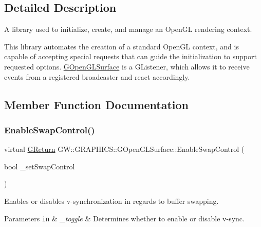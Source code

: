 \subsection{Detailed Description}
A library used to initialize, create, and manage an Open\+GL rendering context. 

This library automates the creation of a standard Open\+GL context, and is capable of accepting special requests that can guide the initialization to support requested options. \mbox{\hyperlink{class_g_w_1_1_g_r_a_p_h_i_c_s_1_1_g_open_g_l_surface}{G\+Open\+G\+L\+Surface}} is a G\+Listener, which allows it to receive events from a registered broadcaster and react accordingly. 

\subsection{Member Function Documentation}
\mbox{\label{class_g_w_1_1_g_r_a_p_h_i_c_s_1_1_g_open_g_l_surface_a1a4d3e9f9e183a4987bf13187d802e66}} 
\subsubsection{\texorpdfstring{Enable\+Swap\+Control()}{EnableSwapControl()}}
{\footnotesize\ttfamily virtual \mbox{\hyperlink{namespace_g_w_a67a839e3df7ea8a5c5686613a7a3de21}{G\+Return}} G\+W\+::\+G\+R\+A\+P\+H\+I\+C\+S\+::\+G\+Open\+G\+L\+Surface\+::\+Enable\+Swap\+Control (\begin{DoxyParamCaption}\item[{bool}]{\+\_\+set\+Swap\+Control }\end{DoxyParamCaption})\hspace{0.3cm}{\ttfamily [pure virtual]}}



Enables or disables v-\/synchronization in regards to buffer swapping. 


\begin{DoxyParams}[1]{Parameters}
\mbox{\tt in}  & {\em \+\_\+toggle} & Determines whether to enable or disable v-\/sync.\\
\hline
\end{DoxyParams}


